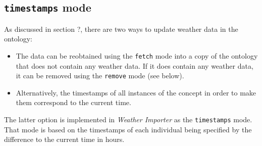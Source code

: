 \subsection{\texttt{timestamps} mode}

As discussed in section ?, there are two ways to update weather data in the \smarthomeweather ontology:
\begin{itemize}
  \item The data can be reobtained using the \texttt{fetch} mode into a copy of the ontology that does not contain any weather data. If it does contain any weather data, it can be removed using the \texttt{remove} mode (see below).
  \item Alternatively, the timestamps of all instances of the  concept in order to make them correspond to the current time.
\end{itemize}

The latter option is implemented in \emph{Weather Importer} as the \texttt{timestamps} mode. That mode is based on the timestamps of each  individual being specified by the difference to the current time in hours.

